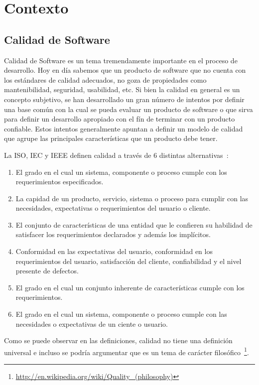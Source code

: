 
\chapter{Contexto}

\section{Calidad de Software}
Calidad de Software es un tema tremendamente importante en el proceso de desarrollo.
Hoy en día sabemos que un producto de software que no cuenta con los estándares de
calidad adecuados, no goza de propiedades como mantenibilidad, seguridad, usabilidad, etc.
Si bien la calidad en general es un concepto subjetivo, se han desarrollado un gran
número de intentos por definir una base común con la cual se pueda evaluar un producto 
de software o que sirva para definir un desarrollo apropiado con el fín de terminar
con un producto confiable. Estos intentos generalmente apuntan a definir un modelo
de calidad que agrupe las principales características que un producto debe tener.

La ISO, IEC y IEEE definen calidad a través de 6 distintas alternativas~\cite{5276043}:
\begin{enumerate}
    \item El grado en el cual un sistema, componente o proceso cumple con los requerimientos especificados.
    \item La capidad de un producto, servicio, sistema o proceso para cumplir con las necesidades, expectativas
    o requerimientos del usuario o cliente.
    \item El conjunto de características de una entidad que le confieren su habilidad de satisfacer los requerimientos
    declarados y además los implícitos.
    \item Conformidad en las expectativas del usuario, conformidad en los requerimientos del usuario, satisfacción del cliente,
    confiabilidad y el nivel presente de defectos.
    \item El grado en el cual un conjunto inherente de características cumple con los requerimientos.
    \item El grado en el cual un sistema, componente o proceso cumple con las necesidades o expectativas de un ciente o usuario.
\end{enumerate}

Como se puede observar en las definiciones, calidad no tiene una definición universal e incluso se podría argumentar
que es un tema de carácter filosófico~\footnote{\url{http://en.wikipedia.org/wiki/Quality_(philosophy)}}.

